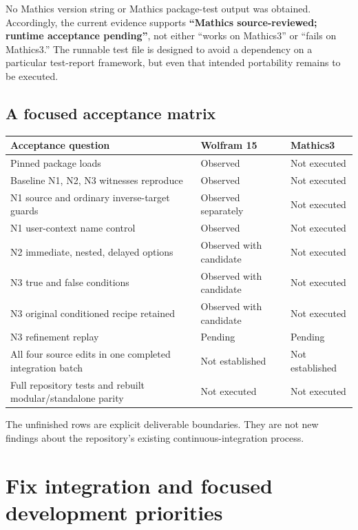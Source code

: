 \documentclass[11pt,letterpaper]{article}
\begin{document}
No Mathics version string or Mathics package-test output was obtained. Accordingly, the current evidence supports \textbf{``Mathics source-reviewed; runtime acceptance pending''}, not either ``works on Mathics3'' or ``fails on Mathics3.'' The runnable test file is designed to avoid a dependency on a particular test-report framework, but even that intended portability remains to be executed.

\subsection{A focused acceptance matrix}

\begin{longtable}{@{}>{\raggedright\arraybackslash}p{}>{\raggedright\arraybackslash}p{}>{\raggedright\arraybackslash}p{}@{}}
\toprule Acceptance question & Wolfram 15 & Mathics3\\
\midrule\endhead
Pinned package loads & Observed & Not executed\\
Baseline N1, N2, N3 witnesses reproduce & Observed & Not executed\\
N1 source and ordinary inverse-target guards & Observed separately & Not executed\\
N1 user-context name control & Observed & Not executed\\
N2 immediate, nested, delayed options & Observed with candidate & Not executed\\
N3 true and false conditions & Observed with candidate & Not executed\\
N3 original conditioned recipe retained & Observed with candidate & Not executed\\
N3 refinement replay & Pending & Pending\\
All four source edits in one completed integration batch & Not established & Not established\\
Full repository tests and rebuilt modular/standalone parity & Not executed & Not executed\\
\bottomrule
\end{longtable}

The unfinished rows are explicit deliverable boundaries. They are not new findings about the repository's existing continuous-integration process.

\section{Fix integration and focused development priorities}
\label{sec:development}
\end{document}
